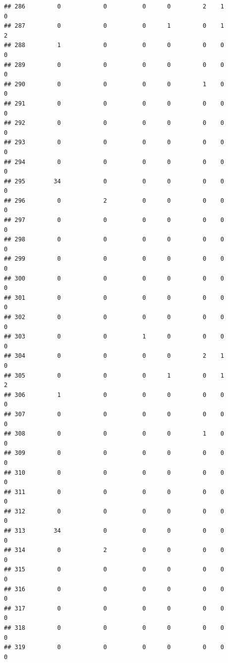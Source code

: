 \documentclass[
]{article}
\begin{document}
\begin{verbatim}
## 286         0            0          0      0         2    1              0
## 287         0            0          0      1         0    1              2
## 288         1            0          0      0         0    0              0
## 289         0            0          0      0         0    0              0
## 290         0            0          0      0         1    0              0
## 291         0            0          0      0         0    0              0
## 292         0            0          0      0         0    0              0
## 293         0            0          0      0         0    0              0
## 294         0            0          0      0         0    0              0
## 295        34            0          0      0         0    0              0
## 296         0            2          0      0         0    0              0
## 297         0            0          0      0         0    0              0
## 298         0            0          0      0         0    0              0
## 299         0            0          0      0         0    0              0
## 300         0            0          0      0         0    0              0
## 301         0            0          0      0         0    0              0
## 302         0            0          0      0         0    0              0
## 303         0            0          1      0         0    0              0
## 304         0            0          0      0         2    1              0
## 305         0            0          0      1         0    1              2
## 306         1            0          0      0         0    0              0
## 307         0            0          0      0         0    0              0
## 308         0            0          0      0         1    0              0
## 309         0            0          0      0         0    0              0
## 310         0            0          0      0         0    0              0
## 311         0            0          0      0         0    0              0
## 312         0            0          0      0         0    0              0
## 313        34            0          0      0         0    0              0
## 314         0            2          0      0         0    0              0
## 315         0            0          0      0         0    0              0
## 316         0            0          0      0         0    0              0
## 317         0            0          0      0         0    0              0
## 318         0            0          0      0         0    0              0
## 319         0            0          0      0         0    0              0

\end{verbatim}
\end{document}
